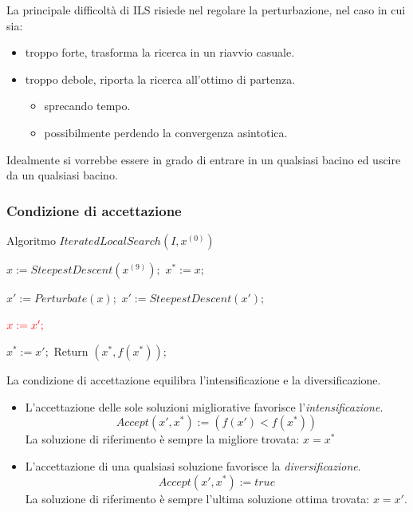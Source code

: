 \documentclass{article}
\begin{document}
La principale difficoltà di ILS risiede nel regolare la perturbazione, nel caso in cui sia:
\begin{itemize}
    \item troppo forte, trasforma la ricerca in un riavvio casuale.
    \item troppo debole, riporta la ricerca all'ottimo di partenza.
    \begin{itemize}
        \item sprecando tempo.
        \item possibilmente perdendo la convergenza asintotica.
    \end{itemize}
\end{itemize}
Idealmente si vorrebbe essere in grado di entrare in un qualsiasi bacino ed uscire da
un qualsiasi bacino.

\subsubsection{Condizione di accettazione}

\begin{algorithm}[H]
    \caption{Algoritmo $IteratedLocalSearch(I,x^{(0)})$}
    \label{alg:ils}
    \begin{algorithmic}
        \State $x:=SteepestDescent(x^{(9)});$
        \State $x^*:=x;$

            \State $x':=Perturbate(x);$
            \State $x':=SteepestDescent(x');$

                \State $\begingroup\color{red} x:=x';\endgroup$
            \EndIf

                \State $x^*:=x';$
            \EndIf
        \EndFor
        \State Return $(x^*,f(x^*));$

    \end{algorithmic}
\end{algorithm}

La condizione di accettazione equilibra l'intensificazione e la diversificazione.
\begin{itemize}
    \item L'accettazione delle sole soluzioni migliorative favorisce l'\textit{intensificazione}.
    $$Accept(x',x^*):=(f(x')<f(x^*))$$
    La soluzione di riferimento è sempre la migliore trovata: $x=x^*$
    \item L'accettazione di una qualsiasi soluzione favorisce la \textit{diversificazione}.
    $$Accept(x',x^*):=true$$
    La soluzione di riferimento è sempre l'ultima soluzione ottima trovata: $x=x'$.
\end{itemize}
\end{document}
